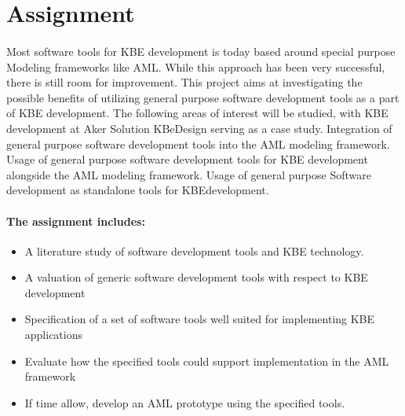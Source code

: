 
\section*{Assignment}

\paragraph{} %
Most software tools for KBE development is today based around special purpose Modeling
frameworks like AML. While this approach has been very successful, there is still room for
improvement. This project aims at investigating the possible benefits of utilizing
general purpose software development tools as a part of KBE development. The following
areas of interest will be studied, with KBE development at Aker Solution KBeDesign serving
as a case study. Integration of general purpose software development tools into the AML
modeling framework. Usage of general purpose software development tools for
KBE development alongside the AML modeling framework. Usage of general purpose
Software development as standalone tools for KBEdevelopment.

\paragraph{The assignment includes:} %
\label{par:the_assignment_includes_}

\begin{itemize}
\item A literature study of software development tools and KBE technology.
\item A valuation of generic software development tools with respect to KBE development
\item Specification of a set of software tools well suited for implementing KBE applications
\item Evaluate how the specified tools could support implementation in the AML framework
\item If time allow, develop an AML prototype using the specified tools.
\end{itemize}